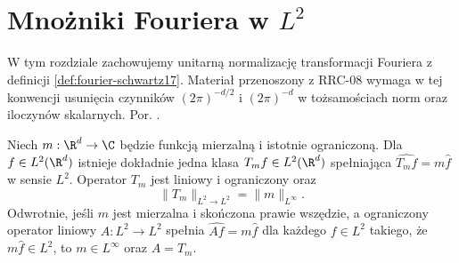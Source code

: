 \setcounter{section}{25}
\section{Mnożniki Fouriera w \texorpdfstring{$L^2$}{L2}}
\label{sec:dt-multipliers-l2}

W tym rozdziale zachowujemy unitarną normalizację
transformacji Fouriera z definicji \ref{def:fourier-schwartz17}.
Materiał przenoszony z RRC-08 wymaga w tej konwencji
usunięcia czynników $(2\pi)^{-d/2}$ i $(2\pi)^{-d}$ w
tożsamościach norm oraz iloczynów skalarnych.
Por. .


\begin{twierdzenie}[Mnożnik w $L^2$]
\label{thm:dt-multiplier-l2}
Niech $m:\R^d\to\C$ będzie funkcją mierzalną i
istotnie ograniczoną. Dla $f\in L^2(\R^d)$ istnieje
dokładnie jedna klasa $T_mf\in L^2(\R^d)$ spełniająca
$\widehat{T_mf}=m\widehat f$ w sensie $L^2$.
Operator $T_m$ jest liniowy i ograniczony oraz
\[
 \|T_m\|_{L^2\to L^2}=\|m\|_{L^\infty}.
\]
Odwrotnie, jeśli $m$ jest mierzalna i skończona
prawie wszędzie, a ograniczony operator liniowy
$A:L^2\to L^2$ spełnia $\widehat{Af}=m\widehat f$
dla każdego $f\in L^2$ takiego, że
$m\widehat f\in L^2$, to $m\in L^\infty$
oraz $A=T_m$.
\end{twierdzenie}
